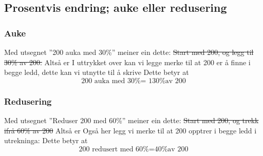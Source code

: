 \subsection{Prosentvis endring; auke eller redusering \label{Proendring}}
\subsubsection{Auke} \label{prookning}
Med utsegnet ''200 auka med 30\%'' meiner ein dette:
\st{
Start med 200, og legg til 30\% av 200.
}
Altså er
I uttrykket over kan vi legge merke  til at 200 er å finne i begge ledd, dette kan vi utnytte til å skrive
Dette betyr at \vs
\[ \text{200 auka med 30\% = 130\% av 200} \] 

\subsubsection{Redusering} \label{proredusering}
Med utsegnet ''Reduser 200 med 60\%'' meiner ein dette:
\st{Start med 200, og trekk ifrå 60\% av 200}
Altså er 
Også her legg vi merke til at 200 opptrer i begge ledd i utrekninga:
Dette betyr at
\[ \text{200 redusert med 60\%}= \text{40\% av 200} \]

